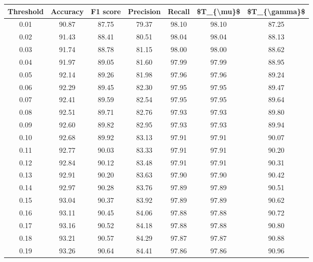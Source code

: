\begin{tabular}{|c|c|c|c|c|c|c|}
\hline
 Threshold &  Accuracy &  F1 score &  Precision &  Recall &  \$T\_\{\textbackslash mu\}\$ &  \$T\_\{\textbackslash gamma\}\$ \\
\hline
      0.01 &     90.87 &     87.75 &      79.37 &   98.10 &      98.10 &         87.25 \\
      0.02 &     91.43 &     88.41 &      80.51 &   98.04 &      98.04 &         88.13 \\
      0.03 &     91.74 &     88.78 &      81.15 &   98.00 &      98.00 &         88.62 \\
      0.04 &     91.97 &     89.05 &      81.60 &   97.99 &      97.99 &         88.95 \\
      0.05 &     92.14 &     89.26 &      81.98 &   97.96 &      97.96 &         89.24 \\
      0.06 &     92.29 &     89.45 &      82.30 &   97.95 &      97.95 &         89.47 \\
      0.07 &     92.41 &     89.59 &      82.54 &   97.95 &      97.95 &         89.64 \\
      0.08 &     92.51 &     89.71 &      82.76 &   97.93 &      97.93 &         89.80 \\
      0.09 &     92.60 &     89.82 &      82.95 &   97.93 &      97.93 &         89.94 \\
      0.10 &     92.68 &     89.92 &      83.13 &   97.91 &      97.91 &         90.07 \\
      0.11 &     92.77 &     90.03 &      83.33 &   97.91 &      97.91 &         90.20 \\
      0.12 &     92.84 &     90.12 &      83.48 &   97.91 &      97.91 &         90.31 \\
      0.13 &     92.91 &     90.20 &      83.63 &   97.90 &      97.90 &         90.42 \\
      0.14 &     92.97 &     90.28 &      83.76 &   97.89 &      97.89 &         90.51 \\
      0.15 &     93.04 &     90.37 &      83.92 &   97.89 &      97.89 &         90.62 \\
      0.16 &     93.11 &     90.45 &      84.06 &   97.88 &      97.88 &         90.72 \\
      0.17 &     93.16 &     90.52 &      84.18 &   97.88 &      97.88 &         90.80 \\
      0.18 &     93.21 &     90.57 &      84.29 &   97.87 &      97.87 &         90.88 \\
      0.19 &     93.26 &     90.64 &      84.41 &   97.86 &      97.86 &         90.96 \\

\end{tabular}
